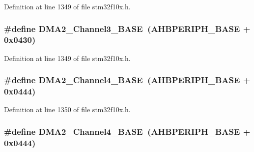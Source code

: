 Definition at line 1349 of file stm32f10x.\+h.

\subsubsection[{\texorpdfstring{D\+M\+A2\+\_\+\+Channel3\+\_\+\+B\+A\+SE}{DMA2_Channel3_BASE}}]{\setlength{\rightskip}{0pt plus 5cm}\#define D\+M\+A2\+\_\+\+Channel3\+\_\+\+B\+A\+SE~({\bf A\+H\+B\+P\+E\+R\+I\+P\+H\+\_\+\+B\+A\+SE} + 0x0430)}\hypertarget{group___peripheral__memory__map_ga6f2369b8bc155fb55a28891987605c2c}{}\label{group___peripheral__memory__map_ga6f2369b8bc155fb55a28891987605c2c}


Definition at line 1349 of file stm32f10x.\+h.

\subsubsection[{\texorpdfstring{D\+M\+A2\+\_\+\+Channel4\+\_\+\+B\+A\+SE}{DMA2_Channel4_BASE}}]{\setlength{\rightskip}{0pt plus 5cm}\#define D\+M\+A2\+\_\+\+Channel4\+\_\+\+B\+A\+SE~({\bf A\+H\+B\+P\+E\+R\+I\+P\+H\+\_\+\+B\+A\+SE} + 0x0444)}\hypertarget{group___peripheral__memory__map_ga01b063266473f290a55047654fbbfbee}{}\label{group___peripheral__memory__map_ga01b063266473f290a55047654fbbfbee}


Definition at line 1350 of file stm32f10x.\+h.

\subsubsection[{\texorpdfstring{D\+M\+A2\+\_\+\+Channel4\+\_\+\+B\+A\+SE}{DMA2_Channel4_BASE}}]{\setlength{\rightskip}{0pt plus 5cm}\#define D\+M\+A2\+\_\+\+Channel4\+\_\+\+B\+A\+SE~({\bf A\+H\+B\+P\+E\+R\+I\+P\+H\+\_\+\+B\+A\+SE} + 0x0444)}\hypertarget{group___peripheral__memory__map_ga01b063266473f290a55047654fbbfbee}{}\label{group___peripheral__memory__map_ga01b063266473f290a55047654fbbfbee}



